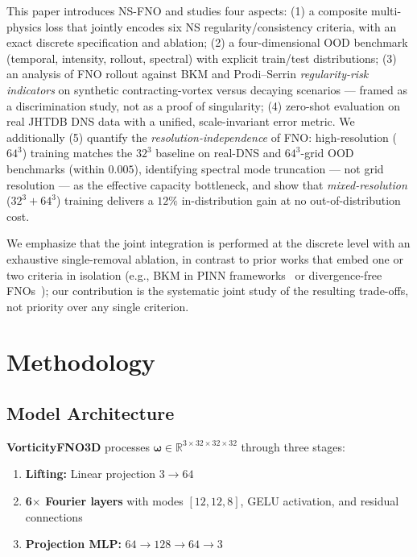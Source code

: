 \documentclass[review]{elsarticle}
\begin{document}
This paper introduces NS-FNO and studies four aspects: (1) a composite multi-physics loss that
jointly encodes six NS regularity/consistency criteria, with an exact discrete specification and
ablation; (2) a four-dimensional OOD benchmark (temporal, intensity, rollout, spectral) with
explicit train/test distributions; (3) an analysis of FNO rollout against BKM and Prodi--Serrin
\emph{regularity-risk indicators} on synthetic contracting-vortex versus decaying scenarios ---
framed as a discrimination study, not as a proof of singularity; (4) zero-shot evaluation on
real JHTDB DNS data with a unified, scale-invariant error metric. We additionally (5) quantify
the \emph{resolution-independence} of FNO: high-resolution ($64^3$) training matches the $32^3$
baseline on real-DNS and $64^3$-grid OOD benchmarks (within $0.005$), identifying spectral mode
truncation --- not grid resolution --- as the effective capacity bottleneck, and show that
\emph{mixed-resolution} ($32^3{+}64^3$) training delivers a $12\%$ in-distribution gain at no
out-of-distribution cost.

We emphasize that the joint integration is performed at the discrete level with an exhaustive
single-removal ablation, in contrast to prior works that embed one or two criteria in
isolation (e.g., BKM in PINN frameworks~\cite{wang2021pinnpathology} or divergence-free
FNOs~\cite{toshev2023divfree}); our contribution is the systematic joint study of the
resulting trade-offs, not priority over any single criterion.

\section{Methodology}
\label{sec:method}

\subsection{Model Architecture}
\label{sec:architecture}

\textbf{VorticityFNO3D} processes $\bm{\omega} \in \mathbb{R}^{3 \times 32 \times 32 \times 32}$ through three stages:
\begin{enumerate}
    \item \textbf{Lifting:} Linear projection $3 \to 64$
    \item \textbf{6$\times$ Fourier layers} with modes $[12,12,8]$, GELU activation, and residual connections
    \item \textbf{Projection MLP:} $64 \to 128 \to 64 \to 3$
\end{enumerate}
\end{document}
